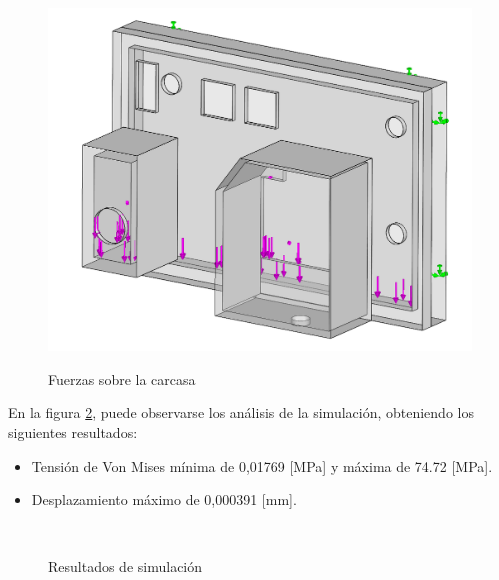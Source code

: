 \begin{figure}[!htb]
    \centering
    \caption{Fuerzas sobre la carcasa} %
    {\includegraphics[width=0.8\columnwidth]{Figuras/cargas.png}}\\
    \label{fig:cargas}
\end{figure}

En la figura \ref{fig:simu}, puede observarse los análisis de la simulación, obteniendo los siguientes resultados:
\begin{itemize}
    \item Tensión de Von Mises mínima de 0,01769 [MPa] y máxima de 74.72 [MPa].
    \item Desplazamiento máximo de 0,000391 [mm].
\end{itemize}
\begin{figure}[hpt]
    \centering
    \caption{Resultados de simulación}
            \qquad      %
        \\
    \label{fig:simu}
\end{figure}
\newpage

